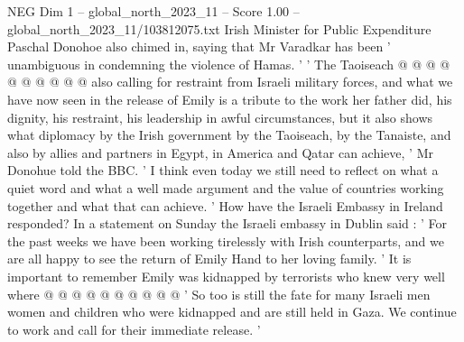 \begin{textsample}{NEG Dim 1 – global\_north\_2023\_11 – Score 1.00 – global\_north\_2023\_11/103812075.txt}
Irish Minister for Public Expenditure Paschal Donohoe also chimed in, saying that Mr Varadkar has been ' unambiguous in condemning the violence of Hamas. ' ' The Taoiseach @ @ @ @ @ @ @ @ @ @ also calling for restraint from Israeli military forces, and what we have now seen in the release of Emily is a tribute to the work her father did, his dignity, his restraint, his leadership in awful circumstances, but it also shows what diplomacy by the Irish government by the Taoiseach, by the Tanaiste, and also by allies and partners in Egypt, in America and Qatar can achieve, ' Mr Donohue told the BBC. ' I think even today we still need to reflect on what a quiet word and what a well made argument and the value of countries working together and what that can achieve. ' How have the Israeli Embassy in Ireland responded?
In a statement on Sunday the Israeli embassy in Dublin said : ' For the past weeks we have been working tirelessly with Irish counterparts, and we are all happy to see the return of Emily Hand to her loving family. ' It is important to remember Emily was kidnapped by terrorists who knew very well where @ @ @ @ @ @ @ @ @ @ ' So too is still the fate for many Israeli men women and children who were kidnapped and are still held in Gaza.
We continue to work and call for their immediate release. '

\end{textsample}
